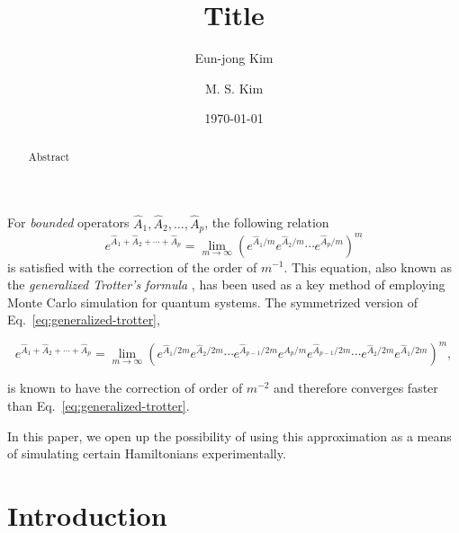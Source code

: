 \documentclass[aps, twocolumn, prl, showpacs, superscriptaddress]{revtex4-1}
\begin{document}
\title{Title} 

\author{Eun-jong Kim}

\author{M. S. Kim}

\begin{abstract}
Abstract
\end{abstract}

\date{\today}
\maketitle
For \emph{bounded} operators ${\hat{A}_1, \hat{A}_2, \ldots, \hat{A}_p}$, the following relation
\begin{equation}\label{eq:generalized-trotter}
e^{\hat{A}_1 + \hat{A}_2 + \cdots + \hat{A}_p} = \lim_{m\rightarrow \infty} \left(e^{\hat{A}_1/m} e^{\hat{A}_2/m} \cdots e^{\hat{A}_p/m}\right)^m
\end{equation}
is satisfied with the correction of the order of $m^{-1}$. This equation, also known as the \emph{generalized Trotter's formula} \cite{Suzuki:1976cf}, has been used as a key method of employing Monte Carlo simulation for quantum systems. The symmetrized version of Eq.~\eqref{eq:generalized-trotter},\begin{widetext}
\begin{equation}
e^{\hat{A}_1 + \hat{A}_2 + \cdots + \hat{A}_p} = \lim_{m\rightarrow\infty} \left(e^{\hat{A}_1/2m} e^{\hat{A}_2/2m} \cdots e^{\hat{A}_{p-1}/2m} e^{\hat{A}_p/m}e^{\hat{A}_{p-1}/2m}\cdots e^{\hat{A}_{2}/2m} e^{\hat{A}_{1}/2m} \right)^m,
\end{equation}\end{widetext}
is known to have the correction of order of $m^{-2}$ and therefore converges faster than Eq.~\eqref{eq:generalized-trotter}.

In this paper, we open up the possibility of using this approximation as a means of simulating certain Hamiltonians experimentally.
\section{Introduction}\label{sec:intro}
\end{document}
